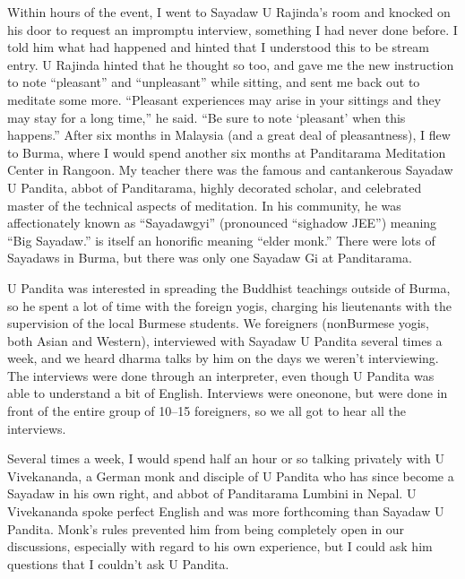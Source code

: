 \documentclass[a5paper,10pt,english]{book}
\begin{document}
\sphinxAtStartPar
Within hours of the event, I went to Sayadaw U Rajinda’s room and
knocked on his door to request an impromptu interview, something I had
never done before. I told him what had happened and hinted that I
understood this to be stream entry. U Rajinda hinted that he thought so
too, and gave me the new instruction to note “pleasant” and “unpleasant”
while sitting, and sent me back out to meditate some more. “Pleasant
experiences may arise in your sittings and they may stay for a long
time,” he said. “Be sure to note ‘pleasant’ when this happens.” After
six months in Malaysia (and a great deal of pleasantness), I flew to
Burma, where I would spend another six months at Panditarama Meditation
Center in Rangoon. My teacher there was the famous and cantankerous
Sayadaw U Pandita, abbot of Panditarama, highly decorated scholar, and
celebrated master of the technical aspects of meditation. In his
community, he was affectionately known as “Sayadawgyi” (pronounced
“sigh\sphinxhyphen{}a\sphinxhyphen{}dow JEE”) meaning “Big Sayadaw.”  is itself an
honorific meaning “elder monk.” There were lots of Sayadaws in Burma,
but there was only one Sayadaw Gi at Panditarama.

\sphinxAtStartPar
U Pandita was interested in spreading the Buddhist teachings outside of
Burma, so he spent a lot of time with the foreign yogis, charging his
lieutenants with the supervision of the local Burmese students. We
foreigners (non\sphinxhyphen{}Burmese yogis, both Asian and Western), interviewed with
Sayadaw U Pandita several times a week, and we heard dharma talks by him
on the days we weren’t interviewing. The interviews were done through an
interpreter, even though U Pandita was able to understand a bit of
English. Interviews were one\sphinxhyphen{}on\sphinxhyphen{}one, but were done in front of the
entire group of 10–15 foreigners, so we all got to hear all the
interviews.

\sphinxAtStartPar
Several times a week, I would spend half an hour or so talking privately
with U Vivekananda, a German monk and disciple of U Pandita who has
since become a Sayadaw in his own right, and abbot of Panditarama
Lumbini in Nepal. U Vivekananda spoke perfect English and was more
forthcoming than Sayadaw U Pandita. Monk’s rules prevented him from
being completely open in our discussions, especially with regard to his
own experience, but I could ask him questions that I couldn’t ask U
Pandita.
\end{document}
